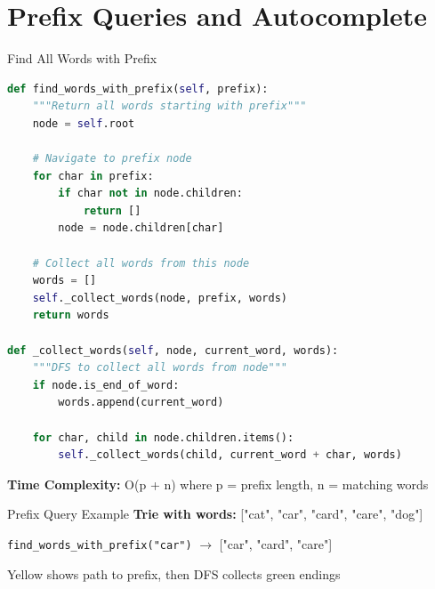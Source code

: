 \documentclass[aspectratio=169]{beamer}
\begin{document}
\section{Prefix Queries and Autocomplete}

\begin{frame}[fragile]{Find All Words with Prefix}
  \begin{lstlisting}[language=Python, basicstyle=\ttfamily\footnotesize]
def find_words_with_prefix(self, prefix):
    """Return all words starting with prefix"""
    node = self.root

    # Navigate to prefix node
    for char in prefix:
        if char not in node.children:
            return []
        node = node.children[char]

    # Collect all words from this node
    words = []
    self._collect_words(node, prefix, words)
    return words

def _collect_words(self, node, current_word, words):
    """DFS to collect all words from node"""
    if node.is_end_of_word:
        words.append(current_word)

    for char, child in node.children.items():
        self._collect_words(child, current_word + char, words)
  \end{lstlisting}

  \textbf{Time Complexity:} O(p + n) where p = prefix length, n = matching words
\end{frame}

\begin{frame}{Prefix Query Example}
  \textbf{Trie with words:} ["cat", "car", "card", "care", "dog"]

  \vspace{0.3cm}
  \begin{center}
  \end{center}

  \vspace{0.3cm}
  \texttt{find\_words\_with\_prefix("car")} $\rightarrow$ ["car", "card", "care"]

  \textcolor{yellow!70!black}{Yellow} shows path to prefix, then DFS collects \textcolor{green!70!black}{green} endings
\end{frame}
\end{document}
